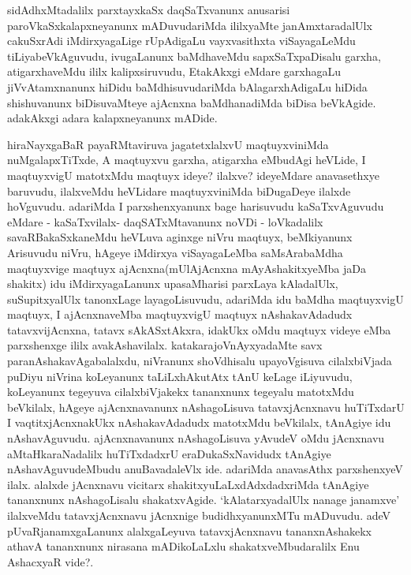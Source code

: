 \begin{artha}
sidAdhxMtadalilx parxtayxkaSx daqSaTxvanunx anusarisi paroVkaSxkalapxneyanunx mADuvudariMda ililxyaMte janAmxtaradalUlx cakuSxrAdi iMdirxyagaLige rUpAdigaLu vayxvasithxta viSayagaLeMdu tiLiyabeVkAguvudu, ivugaLanunx baMdhaveMdu sapxSaTxpaDisalu garxha, atigarxhaveMdu ililx kalipxsiruvudu, EtakAkxgi eMdare garxhagaLu jiVvAtamxnanunx hiDidu baMdhisuvudariMda bAlagarxhAdigaLu hiDida shishuvanunx biDisuvaMteye ajAcnxna baMdhanadiMda biDisa beVkAgide. adakAkxgi adara kalapxneyanunx mADide. 
\end{artha}

\centerline{}

\begin{artha}
hiraNayxgaBaR payaRMtaviruva jagatetxlalxvU maqtuyxviniMda nuMgalapxTiTxde, A maqtuyxvu garxha, atigarxha eMbudAgi heVLide, I maqtuyxvigU matotxMdu maqtuyx ideye? ilalxve? ideyeMdare anavasethxye baruvudu, ilalxveMdu heVLidare maqtuyxviniMda biDugaDeye ilalxde hoVguvudu. adariMda I parxshenxyanunx bage harisuvudu kaSaTxvAguvudu eMdare - kaSaTxvilalx- daqSATxMtavanunx noVDi - loVkadalilx savaRBakaSxkaneMdu heVLuva aginxge niVru maqtuyx, beMkiyanunx Arisuvudu niVru, hAgeye iMdirxya viSayagaLeMba saMsArabaMdha maqtuyxvige maqtuyx ajAcnxna(mUlAjAcnxna mAyAshakitxyeMba jaDa shakitx) idu iMdirxyagaLanunx upasaMharisi parxLaya kAladalUlx, suSupitxyalUlx tanonxLage layagoLisuvudu, adariMda idu baMdha maqtuyxvigU maqtuyx, I ajAcnxnaveMba maqtuyxvigU maqtuyx nAshakavAdadudx tatavxvijAcnxna, tatavx sAkASxtAkxra, idakUkx oMdu maqtuyx videye eMba parxshenxge ililx avakAshavilalx. katakarajoVnAyxyadaMte savx paranAshakavAgabalalxdu, niVranunx shoVdhisalu upayoVgisuva cilalxbiVjada puDiyu niVrina koLeyanunx taLiLxhAkutAtx tAnU keLage iLiyuvudu, koLeyanunx tegeyuva cilalxbiVjakekx tananxnunx tegeyalu matotxMdu beVkilalx, hAgeye ajAcnxnavanunx nAshagoLisuva tatavxjAcnxnavu huTiTxdarU I vaqtitxjAcnxnakUkx nAshakavAdadudx matotxMdu beVkilalx, tAnAgiye idu nAshavAguvudu. ajAcnxnavanunx nAshagoLisuva yAvudeV oMdu jAcnxnavu aMtaHkaraNadalilx huTiTxdadxrU eraDukaSxNavidudx tAnAgiye nAshavAguvudeMbudu anuBavadaleVlx ide. adariMda anavasAthx parxshenxyeV ilalx. alalxde jAcnxnavu vicitarx shakitxyuLaLxdAdxdadxriMda tAnAgiye tananxnunx nAshagoLisalu shakatxvAgide. `kAlatarxyadalUlx nanage janamxve' ilalxveMdu tatavxjAcnxnavu jAcnxnige budidhxyanunxMTu mADuvudu. adeV pUvaRjanamxgaLanunx alalxgaLeyuva tatavxjAcnxnavu tananxnAshakekx athavA tananxnunx nirasana mADikoLaLxlu shakatxveMbudaralilx Enu AshacxyaR vide?.
\end{artha}

